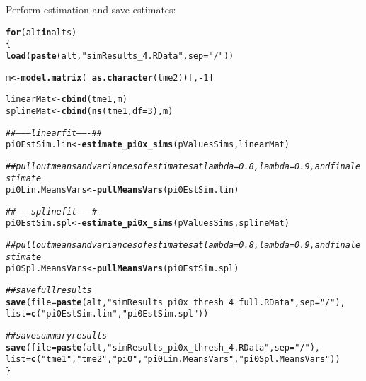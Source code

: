 \documentclass{article}\usepackage[]{graphicx}\usepackage[]{color}
\makeatletter
\newcommand{\hlnum}[1]{\textcolor[rgb]{0.686,0.059,0.569}{#1}}%
\newcommand{\hlstr}[1]{\textcolor[rgb]{0.192,0.494,0.8}{#1}}%
\newcommand{\hlcom}[1]{\textcolor[rgb]{0.678,0.584,0.686}{\textit{#1}}}%
\newcommand{\hlopt}[1]{\textcolor[rgb]{0,0,0}{#1}}%
\newcommand{\hlstd}[1]{\textcolor[rgb]{0.345,0.345,0.345}{#1}}%
\newcommand{\hlkwa}[1]{\textcolor[rgb]{0.161,0.373,0.58}{\textbf{#1}}}%
\newcommand{\hlkwb}[1]{\textcolor[rgb]{0.69,0.353,0.396}{#1}}%
\newcommand{\hlkwc}[1]{\textcolor[rgb]{0.333,0.667,0.333}{#1}}%
\newcommand{\hlkwd}[1]{\textcolor[rgb]{0.737,0.353,0.396}{\textbf{#1}}}%
\newenvironment{kframe}{%
 \def\at@end@of@kframe{}%
 \ifinner\ifhmode%
  \def\at@end@of@kframe{\end{minipage}}%
  \begin{minipage}{\columnwidth}%
 \fi\fi%
 \def\FrameCommand##1{\hskip\@totalleftmargin \hskip-\fboxsep
 \colorbox{shadecolor}{##1}\hskip-\fboxsep
     \hskip-\linewidth \hskip-\@totalleftmargin \hskip\columnwidth}%
 \MakeFramed {\advance\hsize-\width
   \@totalleftmargin\z@ \linewidth\hsize
   \@setminipage}}%
 {\par\unskip\endMakeFramed%
 \at@end@of@kframe}
\newenvironment{knitrout}{}{} %
\makeatother
\begin{document}
Perform estimation and save estimates:

\begin{knitrout}
\color{fgcolor}\begin{kframe}
\begin{alltt}
\hlkwa{for}\hlstd{(alt} \hlkwa{in} \hlstd{alts)}
\hlstd{\{}
  \hlkwd{load}\hlstd{(}\hlkwd{paste}\hlstd{(alt,}\hlstr{"simResults_4.RData"}\hlstd{,}\hlkwc{sep}\hlstd{=}\hlstr{"/"}\hlstd{))}

  \hlstd{m} \hlkwb{<-} \hlkwd{model.matrix}\hlstd{(}\hlopt{~}\hlkwd{as.character}\hlstd{(tme2))[,}\hlopt{-}\hlnum{1}\hlstd{]}

  \hlstd{linearMat} \hlkwb{<-} \hlkwd{cbind}\hlstd{(tme1, m)}
  \hlstd{splineMat} \hlkwb{<-} \hlkwd{cbind}\hlstd{(}\hlkwd{ns}\hlstd{(tme1,}\hlkwc{df}\hlstd{=}\hlnum{3}\hlstd{), m)}

  \hlcom{##--------linear fit-------##}
  \hlstd{pi0EstSim.lin} \hlkwb{<-} \hlkwd{estimate_pi0x_sims}\hlstd{(pValuesSims, linearMat)}

  \hlcom{##pull out means and variances of estimates at lambda=0.8, lambda=0.9, and final estimate}
  \hlstd{pi0Lin.MeansVars} \hlkwb{<-} \hlkwd{pullMeansVars}\hlstd{(pi0EstSim.lin)}

  \hlcom{##---------spline fit---------#}
  \hlstd{pi0EstSim.spl} \hlkwb{<-} \hlkwd{estimate_pi0x_sims}\hlstd{(pValuesSims, splineMat)}

  \hlcom{##pull out means and variances of estimates at lambda=0.8, lambda=0.9, and final estimate}
  \hlstd{pi0Spl.MeansVars} \hlkwb{<-} \hlkwd{pullMeansVars}\hlstd{(pi0EstSim.spl)}

  \hlcom{##save full results}
  \hlkwd{save}\hlstd{(}\hlkwc{file}\hlstd{=}\hlkwd{paste}\hlstd{(alt,}\hlstr{"simResults_pi0x_thresh_4_full.RData"}\hlstd{,}\hlkwc{sep}\hlstd{=}\hlstr{"/"}\hlstd{),}
       \hlkwc{list}\hlstd{=}\hlkwd{c}\hlstd{(}\hlstr{"pi0EstSim.lin"}\hlstd{,}\hlstr{"pi0EstSim.spl"}\hlstd{))}

  \hlcom{##save summary results}
  \hlkwd{save}\hlstd{(}\hlkwc{file}\hlstd{=}\hlkwd{paste}\hlstd{(alt,}\hlstr{"simResults_pi0x_thresh_4.RData"}\hlstd{,}\hlkwc{sep}\hlstd{=}\hlstr{"/"}\hlstd{),}
       \hlkwc{list}\hlstd{=}\hlkwd{c}\hlstd{(}\hlstr{"tme1"}\hlstd{,} \hlstr{"tme2"}\hlstd{,} \hlstr{"pi0"}\hlstd{,} \hlstr{"pi0Lin.MeansVars"}\hlstd{,} \hlstr{"pi0Spl.MeansVars"}\hlstd{))}
\hlstd{\}}
\end{alltt}
\end{kframe}
\end{knitrout}
\end{document}
